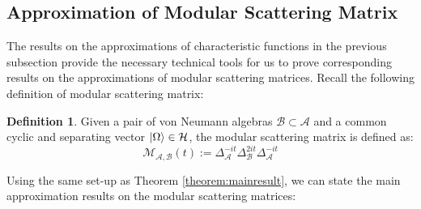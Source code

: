 \documentclass[a4paper,11pt]{article}
\theoremstyle{definition}
\newtheorem{definition}{Definition}[section]
\begin{document}
\subsection{Approximation of Modular Scattering Matrix}\label{subsection:approxscattering}
The results on the approximations of characteristic functions in the previous subsection provide the necessary technical tools for us to prove corresponding results on the approximations of modular scattering matrices. Recall the following definition of modular scattering matrix:
\begin{definition}
    Given a pair of von Neumann algebras $\mathcal{B}\subset\mathcal{A}$ and a common cyclic and separating vector $\ket{\Omega}\in\mathcal{H}$, the modular scattering matrix is defined as:
    \begin{equation}
        \mathcal{M}_{\mathcal{A},\mathcal{B}}(t):=\Delta_\mathcal{A}^{-it}\Delta_\mathcal{B}^{2it}\Delta_\mathcal{A}^{-it}
    \end{equation}
\end{definition}
Using the same set-up as Theorem \ref{theorem:mainresult}, we can state the main approximation results on the modular scattering matrices:
\end{document}
